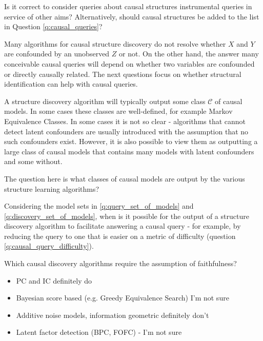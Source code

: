 \begin{question}
    Is it correct to consider queries about causal structures instrumental queries in service of other aims? Alternatively, should causal structures be added to the list in Question \ref{q:causal_queries}?
\end{question}

Many algorithms for causal structure discovery do not resolve whether $X$ and $Y$ are confounded by an unobserved $Z$ or not. On the other hand, the answer many conceivable causal queries will depend on whether two variables are confounded or directly causally related. The next questions focus on whether structural identification can help with causal queries.

\begin{question}\label{q:discovery_set_of_models}
    A structure discovery algorithm will typically output some class $\mathcal{C}$ of causal models. In some cases these classes are well-defined, for example Markov Equivalence Classes. In some cases it is not so clear - algorithms that cannot detect latent confounders are usually introduced with the assumption that no such confounders exist. However, it is also possible to view them as outputting a large class of causal models that contains many models with latent confounders and some without.
    
    The question here is what classes of causal models are output by the various structure learning algorithms?
\end{question}

\begin{question}
    Considering the model sets in \ref{q:query_set_of_models} and \ref{q:discovery_set_of_models}, when is it possible for the output of a structure discovery algorithm to facilitate answering a causal query - for example, by reducing the query to one that is easier on a metric of difficulty (question \ref{q:causal_query_difficulty}).
\end{question}

\begin{question}
    Which causal discovery algorithms require the assumption of faithfulness?
    \begin{itemize}
        \item PC and IC definitely do
        \item Bayesian score based (e.g. Greedy Equivalence Search) I'm not sure
        \item Additive noise models, information geometric definitely don't
        \item Latent factor detection (BPC, FOFC) - I'm not sure \cite{kummerfeld_causal_2016}
    \end{itemize}
\end{question}

